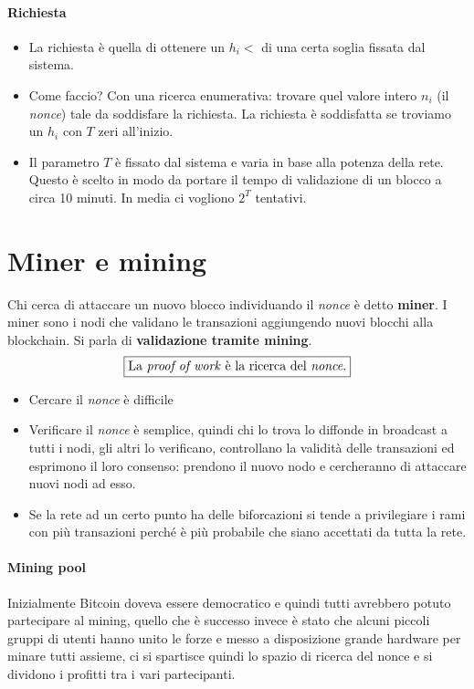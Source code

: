 \paragraph{Richiesta} 
\begin{itemize}
	\item La richiesta è quella di ottenere un $h_i < $ di una certa soglia fissata dal sistema.
	\item Come faccio? Con una ricerca enumerativa: trovare quel valore intero $n_i$ (il \textit{nonce}) tale da soddisfare la richiesta. La richiesta è soddisfatta se troviamo un $h_i$ con $T$ zeri all'inizio.
	\item Il parametro $T$ è fissato dal sistema e varia in base alla potenza della rete.
	Questo è scelto in modo da portare il tempo di validazione di un blocco a circa 10 minuti.
	In media ci vogliono $2^T$ tentativi.
\end{itemize} 
\section{Miner e mining} Chi cerca di attaccare un nuovo blocco individuando il \textit{nonce} è detto \textbf{miner}. I miner sono i nodi che validano le transazioni aggiungendo nuovi blocchi alla blockchain. Si parla di \textbf{validazione tramite mining}.
\[\boxed{\text{La \emph{proof of work} è la ricerca del \textit{nonce}.}}\]
\begin{itemize}
	\item Cercare il \textit{nonce} è difficile
	\item Verificare il \emph{nonce} è semplice, quindi chi lo trova lo diffonde in broadcast a tutti i nodi, gli altri lo verificano, controllano la validità delle transazioni ed esprimono il loro consenso: prendono il nuovo nodo e cercheranno di attaccare nuovi nodi ad esso.
	\item Se la rete ad un certo punto ha delle biforcazioni si tende a privilegiare i rami con più transazioni perché è più probabile che siano accettati da tutta la rete.
\end{itemize}

\paragraph{Mining pool} Inizialmente Bitcoin doveva essere democratico e quindi tutti avrebbero potuto partecipare al mining, quello che è successo invece è stato che alcuni piccoli gruppi di utenti hanno unito le forze e messo a disposizione grande hardware per minare tutti assieme, ci si spartisce quindi lo spazio di ricerca del nonce e si dividono i profitti tra i vari partecipanti.

